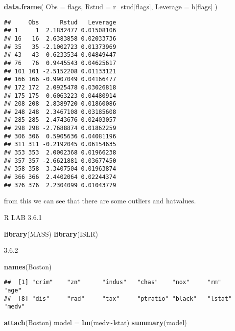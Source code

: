 \documentclass[
]{article}
\newenvironment{Shaded}{\begin{snugshade}}{\end{snugshade}}
\newcommand{\AttributeTok}[1]{\textcolor[rgb]{0.13,0.29,0.53}{#1}}
\newcommand{\FunctionTok}[1]{\textcolor[rgb]{0.13,0.29,0.53}{\textbf{#1}}}
\newcommand{\NormalTok}[1]{#1}
\newcommand{\OtherTok}[1]{\textcolor[rgb]{0.56,0.35,0.01}{#1}}
\newcommand{\SpecialCharTok}[1]{\textcolor[rgb]{0.81,0.36,0.00}{\textbf{#1}}}
\begin{document}
\begin{Shaded}
\begin{Highlighting}[]
\FunctionTok{data.frame}\NormalTok{(}
  \AttributeTok{Obs       =}\NormalTok{ flags,}
  \AttributeTok{Rstud     =}\NormalTok{ r\_stud[flags],}
  \AttributeTok{Leverage  =}\NormalTok{ h[flags]}
\NormalTok{)}
\end{Highlighting}
\end{Shaded}

\begin{verbatim}
##     Obs      Rstud   Leverage
## 1     1  2.1832477 0.01508106
## 16   16  2.6383858 0.02033736
## 35   35 -2.1002723 0.01373969
## 43   43 -0.6233534 0.04849447
## 76   76  0.9445543 0.04625617
## 101 101 -2.5152208 0.01133121
## 166 166 -0.9907049 0.04166477
## 172 172  2.0925478 0.03026818
## 175 175  0.6063223 0.04480914
## 208 208  2.8389720 0.01860086
## 248 248  2.3467108 0.03185608
## 285 285  2.4743676 0.02403057
## 298 298 -2.7688874 0.01862259
## 306 306  0.5905636 0.04081196
## 311 311 -0.2192045 0.06154635
## 353 353  2.0002368 0.01966238
## 357 357 -2.6621881 0.03677450
## 358 358  3.3407504 0.01963874
## 366 366  2.4402064 0.02244374
## 376 376  2.2304099 0.01043779
\end{verbatim}

from this we can see that there are some outliers and hatvalues.

R LAB 3.6.1

\begin{Shaded}
\begin{Highlighting}[]
\FunctionTok{library}\NormalTok{(MASS)}
\FunctionTok{library}\NormalTok{(ISLR)}
\end{Highlighting}
\end{Shaded}

3.6.2

\begin{Shaded}
\begin{Highlighting}[]
\FunctionTok{names}\NormalTok{(Boston)}
\end{Highlighting}
\end{Shaded}

\begin{verbatim}
##  [1] "crim"    "zn"      "indus"   "chas"    "nox"     "rm"      "age"    
##  [8] "dis"     "rad"     "tax"     "ptratio" "black"   "lstat"   "medv"
\end{verbatim}

\begin{Shaded}
\begin{Highlighting}[]
\FunctionTok{attach}\NormalTok{(Boston)}
\NormalTok{model }\OtherTok{=} \FunctionTok{lm}\NormalTok{(medv}\SpecialCharTok{\textasciitilde{}}\NormalTok{lstat)}
\FunctionTok{summary}\NormalTok{(model)}
\end{Highlighting}
\end{Shaded}
\end{document}
